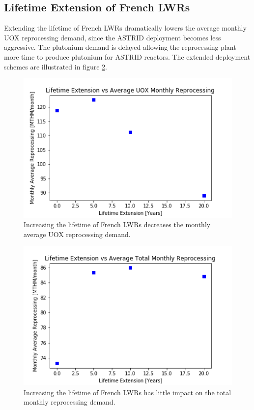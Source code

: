 \subsection{Lifetime Extension of French \glspl{LWR}}
Extending the lifetime of French \glspl{LWR} dramatically lowers the average
monthly \gls{UOX} reprocessing demand, since the \gls{ASTRID} deployment becomes less
aggressive. The plutonium demand is delayed allowing the reprocessing plant more
time to produce plutonium for \gls{ASTRID} reactors. The
extended deployment schemes are illustrated in figure \ref{fig:ext}. 

\begin{figure}[htbp!]
    \begin{center}
        \includegraphics[scale=0.6]{./images/sensitivity/ext_uox.png}
    \end{center}
    \caption{Increasing the lifetime of French \glspl{LWR} decreases the monthly
             average \gls{UOX} reprocessing demand.}
    \label{fig:ext}
\end{figure}


\begin{figure}[htbp!]
    \begin{center}
        \includegraphics[scale=0.6]{./images/sensitivity/ext_all.png}
    \end{center}
    \caption{Increasing the lifetime of French \glspl{LWR} has little impact on the total monthly
             reprocessing demand.}
    \label{fig:ext}
\end{figure}


